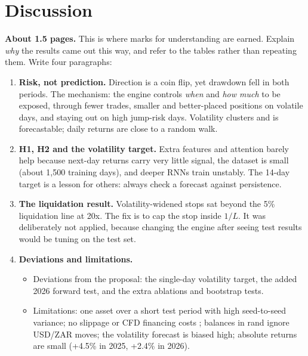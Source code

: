 \section{Discussion}\label{sec:discussion}

\begin{guide}
\textbf{About 1.5 pages.} This is where marks for understanding are earned. Explain \emph{why} the results came out this way, and refer to the tables rather than repeating them. Write four paragraphs:
\begin{enumerate}
  \item \textbf{Risk, not prediction.} Direction is a coin flip, yet drawdown fell in both periods. The mechanism: the engine controls \emph{when} and \emph{how much} to be exposed, through fewer trades, smaller and better-placed positions on volatile days, and staying out on high jump-risk days. Volatility clusters and is forecastable; daily returns are close to a random walk.
  \item \textbf{H1, H2 and the volatility target.} Extra features and attention barely help because next-day returns carry very little signal, the dataset is small (about 1{,}500 training days), and deeper RNNs train unstably. The 14-day target is a lesson for others: always check a forecast against persistence.
  \item \textbf{The liquidation result.} Volatility-widened stops sat beyond the 5\% liquidation line at 20x. The fix is to cap the stop inside $1/L$. It was deliberately not applied, because changing the engine after seeing test results would be tuning on the test set.
  \item \textbf{Deviations and limitations.}
  \begin{itemize}
    \item Deviations from the proposal: the single-day volatility target, the added 2026 forward test, and the extra ablations and bootstrap tests.
    \item Limitations: one asset over a short test period with high seed-to-seed variance; no slippage or CFD financing costs ; balances in rand ignore USD/ZAR moves; the volatility forecast is biased high; absolute returns are small (+4.5\% in 2025, +2.4\% in 2026).
  \end{itemize}
\end{enumerate}
\end{guide}

\tbc{}
